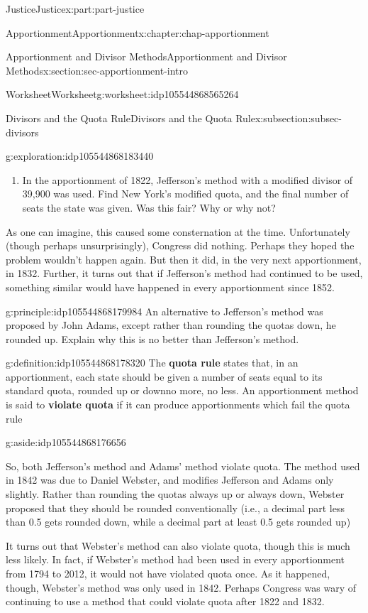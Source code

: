 \documentclass[oneside,10pt,]{book}
\newcommand{\terminology}[1]{\textbf{#1}}
\numberwithin{equation}{section}
\begin{document}
\begin{partptx}{Justice}{}{Justice}{}{}{x:part:part-justice}
\begin{chapterptx}{Apportionment}{}{Apportionment}{}{}{x:chapter:chap-apportionment}
\begin{sectionptx}{Apportionment and Divisor Methods}{}{Apportionment and Divisor Methods}{}{}{x:section:sec-apportionment-intro}
\begin{worksheet-subsection}{Worksheet}{}{Worksheet}{}{}{g:worksheet:idp105544868565264}
\begin{subsectionptx}{Divisors and the Quota Rule}{}{Divisors and the Quota Rule}{}{}{x:subsection:subsec-divisors}
\begin{exploration}{}{g:exploration:idp105544868183440}
\begin{enumerate}[label=(\alph*)]
\item{}In the apportionment of 1822, Jefferson's method with a modified divisor of 39,900 was used. Find New York's modified quota, and the final number of seats the state was given. Was this fair? Why or why not?%
\end{enumerate}
\end{exploration}%
As one can imagine, this caused some consternation at the time. Unfortunately (though perhaps unsurprisingly), Congress did nothing. Perhaps they hoped the problem wouldn't happen again. But then it did, in the very next apportionment, in 1832. Further, it turns out that if Jefferson's method had continued to be used, something similar would have happened in every apportionment since 1852.%
\begin{principle}{}{}{g:principle:idp105544868179984}%
An alternative to Jefferson's method was proposed by John Adams, except rather than rounding the quotas down, he rounded up. Explain why this is no better than Jefferson's method.%
\end{principle}
\begin{definition}{}{g:definition:idp105544868178320}%
The \terminology{quota rule} states that, in an apportionment, each state should be given a number of seats equal to its standard quota, rounded up or down\textemdash{}no more, no less. An apportionment method is said to \terminology{violate quota} if it can produce apportionments which fail the quota rule\begin{aside}{}{g:aside:idp105544868176656}%
\end{aside}
%
\end{definition}
So, both Jefferson's method and Adams' method violate quota. The method used in 1842 was due to Daniel Webster, and modifies Jefferson and Adams only slightly. Rather than rounding the quotas always up or always down, Webster proposed that they should be rounded conventionally (i.e., a decimal part less than 0.5 gets rounded down, while a decimal part at least 0.5 gets rounded up)%
\par
It turns out that Webster's method can also violate quota, though this is much less likely. In fact, if Webster's method had been used in every apportionment from 1794 to 2012, it would not have violated quota once. As it happened, though, Webster's method was only used in 1842. Perhaps Congress was wary of continuing to use a method that could violate quota after 1822 and 1832.%
\par

\end{subsectionptx}
\end{worksheet-subsection}
\end{sectionptx}
\end{chapterptx}
\end{partptx}
\end{document}
